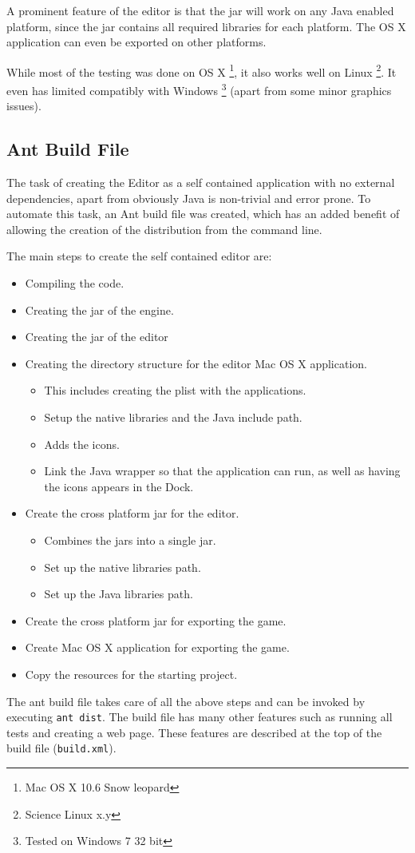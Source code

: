 A prominent feature of the editor is that the jar will work on any Java enabled platform, since the jar contains all required libraries for each platform. The OS X application can even be exported on other platforms.

While most of the testing was done on OS X \footnote{Mac OS X 10.6 Snow leopard}, it also works well on Linux \footnote{Science  Linux x.y}. It  even has limited compatibly with Windows \footnote{Tested on Windows 7 32 bit} (apart from some minor graphics issues).

\subsection{Ant Build File}

The task of creating the Editor as a self contained application with no external dependencies, apart from obviously Java is non-trivial and error prone.  To automate this task, an Ant build file was created, which has an added benefit of allowing the creation of the distribution from the command line. 

The main steps to create the self contained editor are:
\begin{itemize}
	\item Compiling the code.
	\item Creating the jar of the engine.
	\item Creating the jar of the editor
	\item Creating the directory structure for the editor Mac OS X application.
	\begin{itemize}[topsep=0mm,noitemsep ]
		\item This includes creating the plist\cite{plist} with the applications.
		\item Setup the native libraries and the Java include path.
		\item Adds the icons.
		\item Link the Java wrapper so that the application can run, as well as having the  icons appears in the Dock.
	\end{itemize}
	\item Create the cross platform jar for the editor. 
	\begin{itemize}[topsep=0mm,noitemsep ]
		\item Combines the jars into a single jar.
		\item Set up the native libraries path.
		\item Set up the Java libraries path.
	\end{itemize}
	\item Create the cross platform jar for exporting the game.
	\item Create Mac OS X application for exporting the game.
	\item Copy the resources for the starting project.
\end{itemize}

The ant build file takes care of all the above steps and can be invoked by executing \lstinline{ant dist}. The build file has many other features such as running all tests and creating a web page. These features are described at the top of the build file (\texttt{build.xml}).

